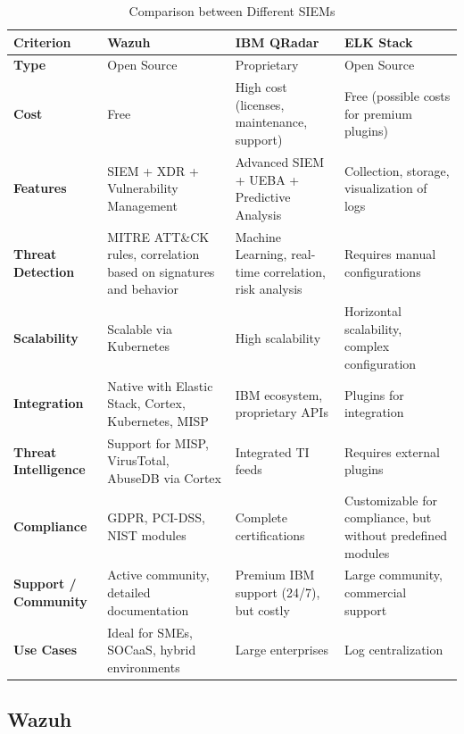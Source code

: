 \begin{table}[H]
\centering
\caption{Comparison between Different SIEMs}
\label{tab:siem-compare}
\footnotesize
\setlength{\tabcolsep}{3pt}
\renewcommand{\arraystretch}{1.3}
\begin{tabular}{>{\RaggedRight\arraybackslash}p{2.8cm} >{\RaggedRight\arraybackslash}p{3cm} >{\RaggedRight\arraybackslash}p{3cm} >{\RaggedRight\arraybackslash}p{3cm}}
\toprule
\rowcolor{tableheader}
\textbf{Criterion} & \textbf{Wazuh} & \textbf{IBM QRadar} & \textbf{ELK Stack} \\
\midrule
\textbf{Type} & Open Source & Proprietary & Open Source \\
\midrule
\textbf{Cost} & Free & High cost (licenses, maintenance, support) & Free (possible costs for premium plugins) \\
\midrule
\textbf{Features} & SIEM + XDR + Vulnerability Management & Advanced SIEM + UEBA + Predictive Analysis & Collection, storage, visualization of logs \\
\midrule
\textbf{Threat Detection} & MITRE ATT\&CK rules, correlation based on signatures and behavior & Machine Learning, real-time correlation, risk analysis & Requires manual configurations \\
\midrule
\textbf{Scalability} & Scalable via Kubernetes & High scalability & Horizontal scalability, complex configuration \\
\midrule
\textbf{Integration} & Native with Elastic Stack, Cortex, Kubernetes, MISP & IBM ecosystem, proprietary APIs & Plugins for integration \\
\midrule
\textbf{Threat Intelligence} & Support for MISP, VirusTotal, AbuseDB via Cortex & Integrated TI feeds & Requires external plugins \\
\midrule
\textbf{Compliance} & GDPR, PCI-DSS, NIST modules & Complete certifications & Customizable for compliance, but without predefined modules \\
\midrule
\textbf{Support / Community} & Active community, detailed documentation & Premium IBM support (24/7), but costly & Large community, commercial support \\
\midrule
\textbf{Use Cases} & Ideal for SMEs, SOCaaS, hybrid environments & Large enterprises & Log centralization \\
\bottomrule
\end{tabular}
\end{table}

\subsection{Wazuh}
\label{subsec:wazuh}

